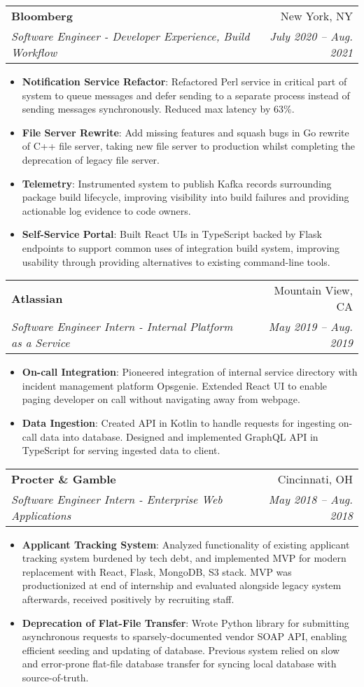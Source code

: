 \documentclass[letterpaper,11pt]{article}
\makeatletter
\newcommand{\resumeItem}[2]{
  \item\small{
    \textbf{#1}{: #2 \vspace{-2pt}}
  }
}
\newcommand{\resumeSubheading}[4]{
  \vspace{-1pt}\item
    \begin{tabular*}{0.97\textwidth}[t]{l@{\extracolsep{\fill}}r}
      \textbf{#1} & #2 \\
      \textit{\small#3} & \textit{\small #4} \\
    \end{tabular*}\vspace{-5pt}
}
\newcommand{\resumeSubSubheading}[2]{
    \begin{tabular*}{0.97\textwidth}{l@{\extracolsep{\fill}}r}
      \textit{\small#1} & \textit{\small #2} \\
    \end{tabular*}\vspace{-5pt}
}
\newcommand{\resumeSubHeadingListEnd}{\end{itemize}}
\newcommand{\resumeItemListStart}{\begin{itemize}}
\newcommand{\resumeItemListEnd}{\end{itemize}\vspace{-5pt}}
\makeatother
\begin{document}
    \resumeSubheading
      {Bloomberg}{New York, NY}
      {Software Engineer - Developer Experience, Build Workflow}{July 2020 -- Aug. 2021}
      \resumeItemListStart
        \resumeItem{Notification Service Refactor}
          {Refactored Perl service in critical part of system to queue messages and defer
          sending to a separate process instead of sending messages synchronously. Reduced max latency by 63\%.}
        \resumeItem{File Server Rewrite}
          {Add missing features and squash bugs in Go rewrite of C++ file server, taking new file server to production
          whilst completing the deprecation of legacy file server.}
        \resumeItem{Telemetry}
          {Instrumented system to publish Kafka records surrounding package build lifecycle, improving 
          visibility into build failures and providing actionable log evidence to code owners. }
        \resumeItem{Self-Service Portal}
          {Built React UIs in TypeScript backed by Flask endpoints to support common uses of integration build system,
          improving usability through providing alternatives to existing command-line tools.}
      \resumeItemListEnd
      

    \resumeSubheading
      {Atlassian}{Mountain View, CA}
      {Software Engineer Intern - Internal Platform as a Service}{May 2019 -- Aug. 2019}
      \resumeItemListStart
        \resumeItem{On-call Integration}
          {Pioneered integration of internal service directory with incident management platform Opsgenie.
          Extended React UI to enable paging developer on call without navigating away from webpage.}
        \resumeItem{Data Ingestion}
          {Created API in Kotlin to handle requests for ingesting on-call data into database. 
          Designed and implemented GraphQL API in TypeScript for serving ingested data to client.}
      \resumeItemListEnd

    \resumeSubheading
      {Procter \& Gamble}{Cincinnati, OH}
      {Software Engineer Intern - Enterprise Web Applications}{May 2018 -- Aug. 2018}
      \resumeItemListStart
        \resumeItem{Applicant Tracking System}
          {Analyzed functionality of existing applicant tracking system burdened by tech debt,
          and implemented MVP for modern replacement with React, Flask, MongoDB, S3 stack.
          MVP was productionized at end of internship and evaluated alongside
          legacy system afterwards, received positively by recruiting staff.}
        \resumeItem{Deprecation of Flat-File Transfer}
          {Wrote Python library for submitting asynchronous requests to sparsely-documented vendor SOAP API,
          enabling efficient seeding and updating of database. Previous system relied on slow and error-prone
          flat-file database transfer for syncing local database with source-of-truth.}
      \resumeItemListEnd
\end{document}
